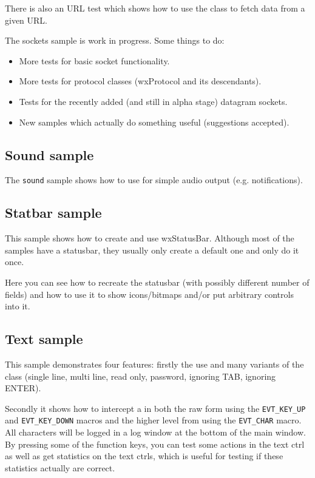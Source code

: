 There is also an URL test which shows how to use
the  class to fetch data from a given URL.

The sockets sample is work in progress. Some things to do:

\begin{itemize}\itemsep=0pt
\item More tests for basic socket functionality.
\item More tests for protocol classes (wxProtocol and its descendants).
\item Tests for the recently added (and still in alpha stage) datagram sockets.
\item New samples which actually do something useful (suggestions accepted).
\end{itemize}


\subsection{Sound sample}\label{samplesound}

The {\tt sound} sample shows how to use  for simple
audio output (e.g. notifications).


\subsection{Statbar sample}\label{samplestatbar}

This sample shows how to create and use wxStatusBar. Although most of the
samples have a statusbar, they usually only create a default one and only
do it once.

Here you can see how to recreate the statusbar (with possibly different number
of fields) and how to use it to show icons/bitmaps and/or put arbitrary
controls into it.


\subsection{Text sample}\label{sampletext}

This sample demonstrates four features: firstly the use and many variants of
the  class (single line, multi line, read only,
password, ignoring TAB, ignoring ENTER).

Secondly it shows how to intercept a  in both
the raw form using the {\tt EVT\_KEY\_UP} and {\tt EVT\_KEY\_DOWN} macros and the
higher level from using the {\tt EVT\_CHAR} macro. All characters will be logged
in a log window at the bottom of the main window. By pressing some of the function
keys, you can test some actions in the text ctrl as well as get statistics on the
text ctrls, which is useful for testing if these statistics actually are correct.

